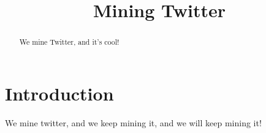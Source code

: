 \documentclass[conference]{IEEEtran}
\begin{document}
\title{Mining Twitter}
	
\author{
}

\maketitle 
\begin{abstract}

We mine Twitter, and it's cool!

\end{abstract}

\section{Introduction}

We mine twitter, and we keep mining it, and we will keep mining it!
\end{document}
